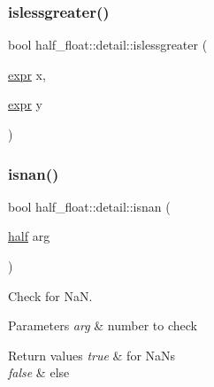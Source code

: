 \mbox{\label{namespacehalf__float_1_1detail_a61b362b9545dbc9319ac437b57963538}} 
\subsubsection{\texorpdfstring{islessgreater()}{islessgreater()}\hspace{0.1cm}{\footnotesize\ttfamily [4/4]}}
{\footnotesize\ttfamily bool half\+\_\+float\+::detail\+::islessgreater (\begin{DoxyParamCaption}\item[{\hyperlink{structhalf__float_1_1detail_1_1expr}{expr}}]{x,  }\item[{\hyperlink{structhalf__float_1_1detail_1_1expr}{expr}}]{y }\end{DoxyParamCaption})\hspace{0.3cm}{\ttfamily [inline]}}

\mbox{\label{namespacehalf__float_1_1detail_ac997496b119af340bfe047bff0583ee4}} 
\subsubsection{\texorpdfstring{isnan()}{isnan()}\hspace{0.1cm}{\footnotesize\ttfamily [1/2]}}
{\footnotesize\ttfamily bool half\+\_\+float\+::detail\+::isnan (\begin{DoxyParamCaption}\item[{\hyperlink{classhalf__float_1_1half}{half}}]{arg }\end{DoxyParamCaption})\hspace{0.3cm}{\ttfamily [inline]}}

Check for NaN. 
\begin{DoxyParams}{Parameters}
{\em arg} & number to check \\
\hline
\end{DoxyParams}

\begin{DoxyRetVals}{Return values}
{\em true} & for Na\+Ns \\
\hline
{\em false} & else \\
\hline
\end{DoxyRetVals}
\mbox{\label{namespacehalf__float_1_1detail_a8f05e6f9157536d7bc25fe4232491924}} 
